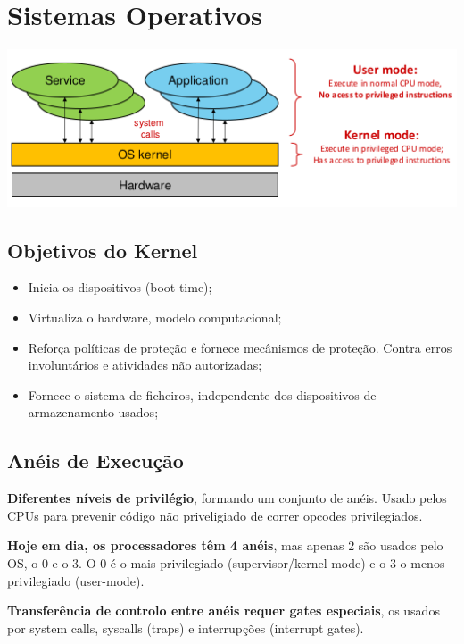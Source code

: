 \documentclass{article}
\begin{document}
\pagebreak

\section{Sistemas Operativos}

\begin{center}
  \includegraphics[scale=0.4]{28}
\end{center}

\subsection{Objetivos do Kernel}

\begin{flushleft}
  \begin{itemize}
    \item Inicia os dispositivos (boot time);
    \item Virtualiza o hardware, modelo computacional;
    \item Reforça políticas de proteção e fornece mecânismos de proteção. Contra
    erros involuntários e atividades não autorizadas;
    \item Fornece o sistema de ficheiros, independente dos dispositivos de armazenamento usados;
  \end{itemize}
\end{flushleft}

\subsection{Anéis de Execução}

\begin{flushleft}
  \textbf{Diferentes níveis de privilégio}, formando um conjunto de anéis. Usado
  pelos CPUs para prevenir código não priveligiado de correr opcodes privilegiados.

  \vspace{2mm}

  \textbf{Hoje em dia, os processadores têm 4 anéis}, mas apenas 2 são usados pelo OS,
  o 0 e o 3. O 0 é o mais privilegiado (supervisor/kernel mode) e o 3 o menos privilegiado (user-mode).

  \vspace{2mm}

  \textbf{Transferência de controlo entre anéis requer gates especiais}, os usados por system calls, syscalls (traps)
  e interrupções (interrupt gates).
\end{flushleft}
\end{document}
